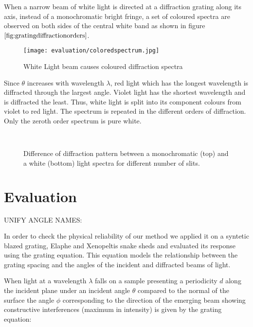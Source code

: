 When a narrow beam of white light is directed at a diffraction grating along its axis, instead of a monochromatic bright fringe, a set of coloured spectra are observed on both sides of the central white band as shown in figure $\ref{fig:gratingdiffractionorders}$.

\begin{figure}[H]
  \centering
  \texttt{[image: evaluation/coloredspectrum.jpg]}
  \label{fig:diffractionSpectrum}
  \caption{White Light beam causes coloured diffraction spectra}
\end{figure}

Since $\theta$ increases with wavelength $\lambda$, red light which has the longest wavelength is diffracted through the largest angle. Violet light has the shortest wavelength and is diffracted the least. Thus, white light is split into its component colours from violet to red light. The spectrum is repeated in the different orders of diffraction. Only the zeroth order spectrum is pure white.

\begin{figure}[H]
  \centering
~
~
~
  
  \label{fig:diffractionSlits}
  \caption{Difference of diffraction pattern between a monochromatic (top) and a white (bottom) light spectra for different number of slits.}
\end{figure}

\section{Evaluation}
UNIFY ANGLE NAMES: 

In order to check the physical reliability of our method we applied it on a syntetic blazed grating, Elaphe and Xenopeltis snake sheds and evaluated its response using the grating equation. This equation models the relationship between the grating spacing and the angles of the incident and diffracted beams of light. 

When light at a wavelength $\lambda$ falls on a sample presenting a periodicity $d$ along the incident plane under an incident angle $\theta$ compared to the normal of the surface the angle $\phi$ corresponding to the direction of the emerging beam showing constructive interferences (maximum in intensity) is given by the grating equation:

